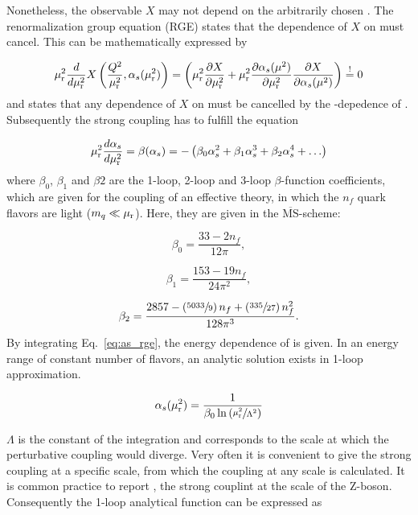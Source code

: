 Nonetheless, the observable $X$ may not depend on the arbitrarily chosen \mur.
The renormalization group equation (RGE) states that the dependence of $X$ on
\mur must cancel. This can be mathematically expressed by

\begin{equation} 
    \mu_{\mathrm{r}}^2 \frac{d}{d \mu_{\mathrm{r}}^2} X \left(\frac{Q^2}{\mu_{\mathrm{r}}^2},\alpha_{s}(\mu_{\mathrm{r}}^2)\right) = \left(
    \mu_{\mathrm{r}}^2 \frac{\partial X}{\partial \mu_{\mathrm{r}}^2} + \mu_{\mathrm{r}}^2 \frac{\partial
    \alpha_{s}(\mu^2)}{\partial \mu_{\mathrm{r}}^2} \frac{\partial X}{\partial \alpha_{s}(\mu^2)} \right) \stackrel{!}{=} 0 
\end{equation}
%
and states that any dependence of $X$ on \mur must be cancelled by the
\mur-depedence of \as. Subsequently the strong coupling has to fulfill the
equation

\begin{equation}
    \mu_{\mathrm{r}}^2 \frac{d \alpha_{s}}{d \mu_{\mathrm{r}}^2} = \beta(\alpha_{s}) = - \left( \beta_0 \alpha_{s}^2 + \beta_1 \alpha_{s}^3
    + \beta_2 \alpha_{s}^4 + \ldots \right)
    \label{eq:as_rge}
\end{equation}
%
where $\beta_0$, $\beta_1$ and $\beta 2$ are the 1-loop, 2-loop and 3-loop 
$\beta$-function coefficients, which are given for the coupling of an effective
theory, in which the $n_f$ quark flavors are light ($m_q \ll \mu_{\mathrm{r}}$). Here, they
are given in the $\overline{\mathrm{MS}}$-scheme:

\begin{equation} 
    \beta_0 = \frac{33 - 2 n_f}{12\pi},
\end{equation}

\begin{equation} 
    \beta_1 = \frac{153 - 19 n_f}{24\pi^2},
\end{equation}

\begin{equation} 
   \beta_2 = \frac{2857 -\left(\sfrac{5033}{9}\right)n_f + \left(\sfrac{335}{27}
   \right)n_f^2}{128 \pi^3}.
\end{equation}
%
By integrating Eq.~\ref{eq:as_rge}, the energy dependence of \as is given. In an
energy range of constant number of flavors, an analytic solution exists in
1-loop approximation. 

\begin{equation*}
   \alpha_{s}(\mu_{\mathrm{r}}^2) = \frac{1}{\beta_0 \ln \left( \sfrac{\mu_{\mathrm{r}}^2}{\Lambda^2} \right)}
\end{equation*}

$\Lambda$ is the constant of the integration and corresponds to the scale at
which the perturbative coupling would diverge. Very often it is convenient to
give the strong coupling at a specific scale, from which the coupling at any
scale is calculated. It is common practice to report \asmz, the strong couplint
at the scale of the Z-boson. Consequently the 1-loop analytical function can be
expressed as

